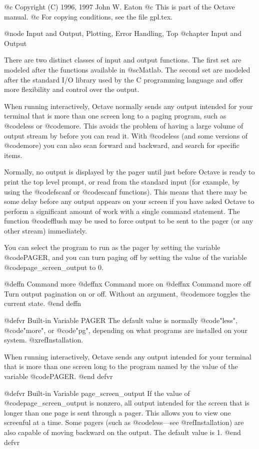@c Copyright (C) 1996, 1997 John W. Eaton
@c This is part of the Octave manual.
@c For copying conditions, see the file gpl.tex.

@node Input and Output, Plotting, Error Handling, Top
@chapter Input and Output

There are two distinct classes of input and output functions.  The first
set are modeled after the functions available in @sc{Matlab}.  The
second set are modeled after the standard I/O library used by the C
programming language and offer more flexibility and control over the
output.

When running interactively, Octave normally sends any output intended
for your terminal that is more than one screen long to a paging program,
such as @code{less} or @code{more}.  This avoids the problem of having a
large volume of output stream by before you can read it.  With
@code{less} (and some versions of @code{more}) you can also scan forward
and backward, and search for specific items.

Normally, no output is displayed by the pager until just before Octave
is ready to print the top level prompt, or read from the standard input
(for example, by using the @code{fscanf} or @code{scanf} functions).
This means that there may be some delay before any output appears on
your screen if you have asked Octave to perform a significant amount of
work with a single command statement.  The function @code{fflush} may be
used to force output to be sent to the pager (or any other stream)
immediately.

You can select the program to run as the pager by setting the variable
@code{PAGER}, and you can turn paging off by setting the value of the
variable @code{page_screen_output} to 0.

@deffn {Command} more
@deffnx {Command} more on
@deffnx {Command} more off
Turn output pagination on or off.  Without an argument, @code{more}
toggles the current state.
@end deffn

@defvr {Built-in Variable} PAGER
The default value is normally @code{"less"}, @code{"more"}, or
@code{"pg"}, depending on what programs are installed on your system.
@xref{Installation}.

When running interactively, Octave sends any output intended for your
terminal that is more than one screen long to the program named by the
value of the variable @code{PAGER}.
@end defvr

@defvr {Built-in Variable} page_screen_output
If the value of @code{page_screen_output} is nonzero, all output
intended for the screen that is longer than one page is sent through a
pager.  This allows you to view one screenful at a time.  Some pagers
(such as @code{less}---see @ref{Installation}) are also capable of moving
backward on the output.  The default value is 1.
@end defvr

